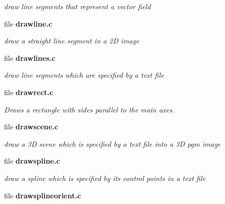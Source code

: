 \begin{DoxyCompactItemize}
\begin{DoxyCompactList}\small\item\em draw line segments that represent a vector field \item\end{DoxyCompactList}

\item 
file {\bf drawline.c}


\begin{DoxyCompactList}\small\item\em draw a straight line segment in a 2D image \item\end{DoxyCompactList}

\item 
file {\bf drawlines.c}


\begin{DoxyCompactList}\small\item\em draw line segments which are specified by a text file \item\end{DoxyCompactList}

\item 
file {\bf drawrect.c}


\begin{DoxyCompactList}\small\item\em Draws a rectangle with sides parallel to the main axes. \item\end{DoxyCompactList}

\item 
file {\bf drawscene.c}


\begin{DoxyCompactList}\small\item\em draw a 3D scene which is specified by a text file into a 3D pgm image \item\end{DoxyCompactList}

\item 
file {\bf drawspline.c}


\begin{DoxyCompactList}\small\item\em draw a spline which is specified by its control points in a text file \item\end{DoxyCompactList}

\item 
file {\bf drawsplineorient.c}



\end{DoxyCompactItemize}
